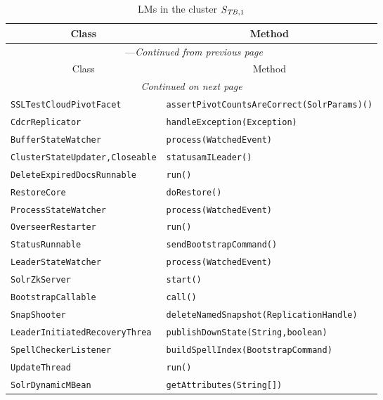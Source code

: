 \begin{center}
\begin{longtable}{ll}
\caption{LMs in the cluster $\mathit{S}_{\mathit{TB},1}$}\\
\toprule\multicolumn{1}{c}{Class}&\multicolumn{1}{c}{Method}\\\midrule
\endfirsthead

\multicolumn{2}{c}{\tablename\ \thetable{}---\textit{Continued from previous page}} \\\midrule
\multicolumn{1}{c}{Class}&\multicolumn{1}{c}{Method}\\\midrule
\endhead
\multicolumn{2}{c}{\textit{Continued on next page}}\\\midrule
\endfoot
\bottomrule
\endlastfoot

\lstinline/SSLTestCloudPivotFacet/&{\lstinline/assertPivotCountsAreCorrect(SolrParams)()/}\\
\lstinline/CdcrReplicator/&{\lstinline/handleException(Exception)/}\\
\lstinline/BufferStateWatcher/&{\lstinline/process(WatchedEvent)/}\\
\lstinline/ClusterStateUpdater,Closeable/&{\lstinline/statusamILeader()/}\\
\lstinline/DeleteExpiredDocsRunnable/&{\lstinline/run()/}\\
\lstinline/RestoreCore/&{\lstinline/doRestore()/}\\
\lstinline/ProcessStateWatcher/&{\lstinline/process(WatchedEvent)/}\\
\lstinline/OverseerRestarter/&{\lstinline/run()/}\\
\lstinline/StatusRunnable/&{\lstinline/sendBootstrapCommand()/}\\
\lstinline/LeaderStateWatcher/&{\lstinline/process(WatchedEvent)/}\\
\lstinline/SolrZkServer/&{\lstinline/start()/}\\
\lstinline/BootstrapCallable/&{\lstinline/call()/}\\
\lstinline/SnapShooter/&{\lstinline/deleteNamedSnapshot(ReplicationHandle)/}\\
\lstinline/LeaderInitiatedRecoveryThrea/&{\lstinline/publishDownState(String,boolean)/}\\
\lstinline/SpellCheckerListener/&{\lstinline/buildSpellIndex(BootstrapCommand)/}\\
\lstinline/UpdateThread/&{\lstinline/run()/}\\
\lstinline/SolrDynamicMBean/&{\lstinline/getAttributes(String[])/}\\

\end{longtable}
\end{center}
